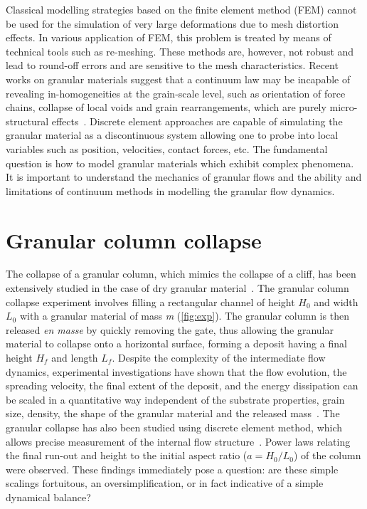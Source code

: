 Classical modelling strategies based on the finite element method (FEM) cannot 
be used for the simulation of very large deformations due to mesh distortion 
effects. 
In various application of FEM, this problem is treated by means of technical 
tools such as re-meshing. These methods are, however, not robust and lead to 
round-off errors and are sensitive to the mesh characteristics. Recent works on 
granular materials suggest that a continuum law may be incapable of revealing 
in-homogeneities at 
the grain-scale level, such as orientation of force chains, collapse of local 
voids and grain rearrangements, which are purely micro-structural 
effects~\citep{Rycroft2009a}. Discrete element approaches 
are capable of simulating the granular material as a discontinuous system 
allowing one to probe into local variables such as position, velocities, 
contact forces, etc. The fundamental question is how to model granular 
materials which exhibit complex phenomena. It is important to understand the 
mechanics of granular flows and the ability and limitations of continuum 
methods in modelling the granular flow dynamics. 

\section{Granular column collapse}
\label{sec:dry_granular_column}
The collapse of a granular column, which mimics the
collapse of a cliff, has been extensively studied in the case of
dry granular 
material~\citep{Lube2005,Lajeunesse2004,Kerswell2005,Zenit2005,Staron2007a,Hogg2007,Lo2009}.
The granular column collapse experiment involves filling a rectangular channel 
of height $H_0$ and width $L_0$ with a granular material of mass 
\textit{m} (\cref{fig:exp}). The granular column is then released \textit{en 
masse} by quickly removing the gate, thus allowing the granular material to 
collapse onto a horizontal surface, forming a deposit having a final height 
$H_f$ and length $L_f$. Despite the complexity of the intermediate flow 
dynamics, experimental investigations have shown that the flow evolution, the 
spreading velocity, the final extent of the deposit, and the energy dissipation 
can be scaled in a quantitative way independent of the substrate properties, 
grain size, density, the shape of the granular material and the released 
mass~\citep{Staron2007a,Lajeunesse2005,Lube2005}. The granular collapse has 
also been studied using discrete element method, which allows precise 
measurement of the internal flow 
structure~\citep{Lo2009,Staron2005,Staron2007a,Utili2014}.
Power laws relating the final run-out and height to the initial aspect ratio 
($a = H_0 / L_0$) of the column were observed. These findings immediately pose 
a question: are these simple scalings fortuitous, an oversimplification, or in 
fact indicative of a simple dynamical balance? 


